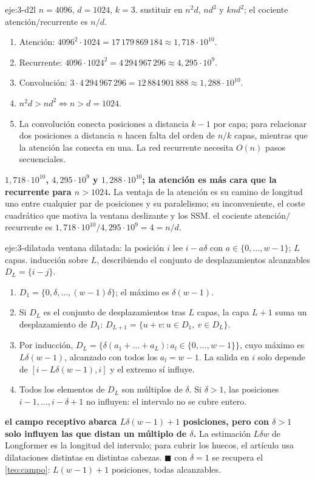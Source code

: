 \begin{solucion}{eje:3-d2l}
\datos $n=4096$, $d=1024$, $k=3$.
\planteamiento sustituir en $n^{2}d$, $nd^{2}$ y $knd^{2}$; el cociente atención$/$recurrente es $n/d$.
\pasos
\begin{enumerate}[label=\arabic*.]
  \item Atención: $4096^{2}\cdot 1024=17\,179\,869\,184\approx 1{,}718\cdot 10^{10}$.
  \item Recurrente: $4096\cdot 1024^{2}=4\,294\,967\,296\approx 4{,}295\cdot 10^{9}$.
  \item Convolución: $3\cdot 4\,294\,967\,296=12\,884\,901\,888\approx 1{,}288\cdot 10^{10}$.
  \item $n^{2}d>nd^{2}\iff n>d=1024$.
  \item La convolución conecta posiciones a distancia $k-1$ por capa; para relacionar dos posiciones a distancia $n$ hacen falta del orden de $n/k$ capas, mientras que la atención las conecta en una. La red recurrente necesita $O(n)$ pasos secuenciales.
\end{enumerate}
\resultado \textbf{$1{,}718\cdot 10^{10}$, $4{,}295\cdot 10^{9}$ y $1{,}288\cdot 10^{10}$; la atención es más cara que la recurrente para $n>1024$.} La ventaja de la atención es su camino de longitud uno entre cualquier par de posiciones y su paralelismo; su inconveniente, el coste cuadrático que motiva la ventana deslizante y los SSM.
\comprobacion el cociente atención$/$recurrente es $1{,}718\cdot 10^{10}/4{,}295\cdot 10^{9}=4=n/d$.
\end{solucion}

\begin{solucion}{eje:3-dilatada}
\datos ventana dilatada: la posición $i$ lee $i-a\delta$ con $a\in\{0,\dots,w-1\}$; $L$ capas.
\planteamiento inducción sobre $L$, describiendo el conjunto de desplazamientos alcanzables $D_L=\{i-j\}$.
\pasos
\begin{enumerate}[label=\arabic*.]
  \item $D_1=\{0,\delta,\dots,(w-1)\delta\}$; el máximo es $\delta(w-1)$.
  \item Si $D_L$ es el conjunto de desplazamientos tras $L$ capas, la capa $L+1$ suma un desplazamiento de $D_1$: $D_{L+1}=\{u+v:u\in D_1,\ v\in D_L\}$.
  \item Por inducción, $D_L=\{\delta(a_1+\dots+a_L):a_l\in\{0,\dots,w-1\}\}$, cuyo máximo es $L\delta(w-1)$, alcanzado con todos los $a_l=w-1$. La salida en $i$ solo depende de $[i-L\delta(w-1),i]$ y el extremo sí influye.
  \item Todos los elementos de $D_L$ son múltiplos de $\delta$. Si $\delta>1$, las posiciones $i-1,\dots,i-\delta+1$ no influyen: el intervalo no se cubre entero.
\end{enumerate}
\resultado \textbf{el campo receptivo abarca $L\delta(w-1)+1$ posiciones, pero con $\delta>1$ solo influyen las que distan un múltiplo de $\delta$.} La estimación $L\delta w$ de Longformer es la longitud del intervalo; para cubrir los huecos, el artículo usa dilataciones distintas en distintas cabezas. $\blacksquare$
\comprobacion con $\delta=1$ se recupera el \cref{teo:campo}: $L(w-1)+1$ posiciones, todas alcanzables.
\end{solucion}

